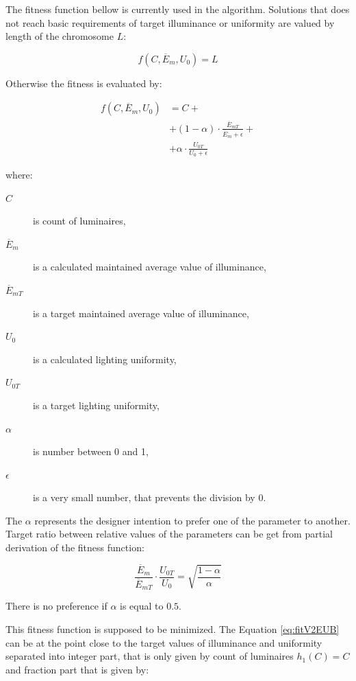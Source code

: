 The fitness function bellow is currently used in the algorithm. Solutions that does not reach basic requirements of target illuminance or uniformity are valued by length of the chromosome $L$:

\begin{equation}
\label{eq:fitV2EUA}
	f\left(C,\overline{E}_{m}, U_0\right)= L
\end{equation}

\noindent Otherwise the fitness is evaluated by:

\begin{equation}
\label{eq:fitV2EUB}
\begin{split}
f\left(C, \overline{E}_{m}, U_0\right)&=C +\\
& + \left( 1 - \alpha\right)\cdot\frac{\overline{E}_{mT}}{\overline{E}_{m}+\epsilon} + \\
& + \alpha\cdot\frac{U_{0T}}{U_0 + \epsilon}
\end{split}
\end{equation}

\noindent where:
\begin{description}
	\item[$C$] is count of luminaires,
	\item[$\overline{E}_{m}$] is a calculated maintained average value of illuminance,
	\item[$\overline{E}_{mT}$] is a target maintained average value of illuminance,
	\item[$U_0$] is a calculated lighting uniformity,
	\item[$U_{0T}$] is a target lighting uniformity,
	\item[$\alpha$] is number between 0 and 1,
	\item[$\epsilon$] is a very small number, that prevents the division by 0.
\end{description}

The $\alpha$ represents the designer intention to prefer one of the parameter to another. Target ratio between relative values of the parameters can be get from partial derivation of the fitness function:

\begin{equation}
\label{eq:fitV2ratio}
\frac{\overline{E}_{m}}{\overline{E}_{mT}}\cdot\frac{U_{0T}}{U_0}=\sqrt{\frac{1-\alpha}{\alpha}}
\end{equation}

\noindent There is no preference if $\alpha$ is equal to $0.5$.

This fitness function is supposed to be minimized. The Equation \ref{eq:fitV2EUB} can be at the point close to the target values of illuminance and uniformity separated into integer part, that is only given by count of luminaires $h_1\left(C\right)= C$ and fraction part that is given by:


